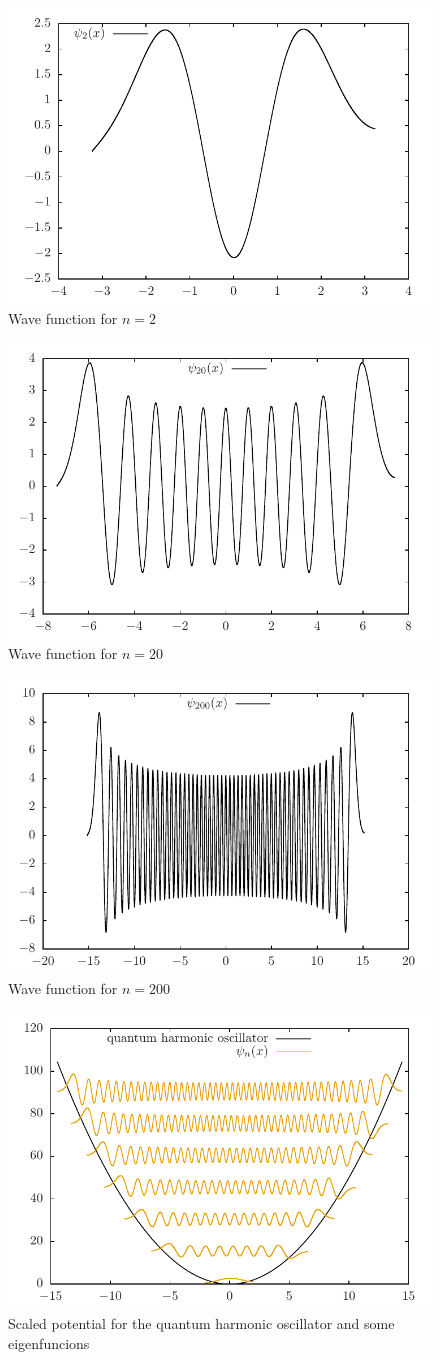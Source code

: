 \documentclass[11pt]{article}
\begin{document}
\begin{figure}[H]
  \centering
  \includegraphics[width=.7\linewidth]{schrodinger-n2}
  \caption{Wave function for $n=2$}
  \label{fig:schrodinger-n2}
\end{figure}
\begin{figure}[H]
  \centering
  \includegraphics[width=.7\linewidth]{schrodinger-n20}
  \caption{Wave function for $n=20$}
  \label{fig:schrodinger-n20}
\end{figure}
\begin{figure}[H]
  \centering
  \includegraphics[width=.7\linewidth]{schrodinger-n200}
  \caption{Wave function for $n=200$}
  \label{fig:schrodinger-n200}
\end{figure}

\begin{figure}[H]
  \centering
  \includegraphics[width=.7\linewidth]{schrodinger-n}
  \caption{Scaled potential for the quantum harmonic oscillator and some eigenfuncions}
  \label{fig:schrodinger-n}
\end{figure}
\end{document}
